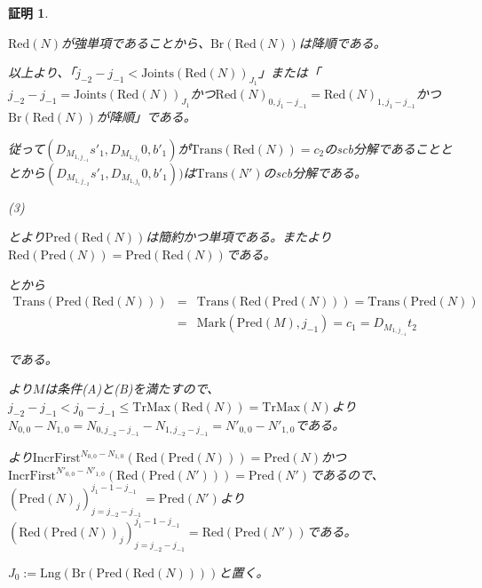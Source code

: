 \documentclass[dvipdfmx,uplatex]{jsarticle}
\theoremstyle{customnonumberbreakfortheorem}
\theoremstyle{customnonumberbreakforproof}
\newtheorem{hideableproof}{証明}
\begin{document}
\begin{hideableproof}
\begin{indented}
\begin{indented}
			\item \(\textrm{Red}(N)\)が強単項であることから、\(\textrm{Br}(\textrm{Red}(N))\)は降順である。
		\end{indented}
		\item 以上より、「\(j_{-2}-j_{-1} < \textrm{Joints}(\textrm{Red}(N))_{J_1}\)」または「\(j_{-2}-j_{-1} = \textrm{Joints}(\textrm{Red}(N))_{J_1}\)かつ\(\textrm{Red}(N)_{0,j_1-j_{-1}} = \textrm{Red}(N)_{1,j_1-j_{-1}}\)かつ\(\textrm{Br}(\textrm{Red}(N))\)が降順」である。
		\item 従って\((D_{M_{1,j_{-1}}} s'_1,D_{M_{1,j_1}} 0,b'_1)\)が\(\textrm{Trans}(\textrm{Red}(N)) = c_2\)のscb分解であることととから\((D_{M_{1,j_{-2}}} s'_1,D_{M_{1,j_1}} 0,b'_1))\)は\(\textrm{Trans}(N')\)のscb分解である。
		\item
		\item (3)
		\item {}とより\(\textrm{Pred}(\textrm{Red}(N))\)は簡約かつ単項である。またより\(\textrm{Red}(\textrm{Pred}(N)) = \textrm{Pred}(\textrm{Red}(N))\)である。
		\item {}とから
		\begin{eqnarray*}
		\textrm{Trans}(\textrm{Pred}(\textrm{Red}(N))) & = & \textrm{Trans}(\textrm{Red}(\textrm{Pred}(N))) = \textrm{Trans}(\textrm{Pred}(N)) \\
		& = & \textrm{Mark}(\textrm{Pred}(M),j_{-1}) = c_1 = D_{M_{1,j_{-1}}} t_2
		\end{eqnarray*}
		\item である。
		\item {}より\(M\)は条件(A)と(B)を満たすので、\(j_{-2}-j_{-1} < j_0-j_{-1} \leq \textrm{TrMax}(\textrm{Red}(N)) = \textrm{TrMax}(N)\)より\(N_{0,0}-N_{1,0} = N_{0,j_{-2}-j_{-1}}-N_{1,j_{-2}-j_{-1}} = N'_{0,0}-N'_{1,0}\)である。
		\item {}より\(\textrm{IncrFirst}^{N_{0,0}-N_{1,0}}(\textrm{Red}(\textrm{Pred}(N))) = \textrm{Pred}(N)\)かつ\(\textrm{IncrFirst}^{N'_{0,0}-N'_{1,0}}(\textrm{Red}(\textrm{Pred}(N'))) = \textrm{Pred}(N')\)であるので、\((\textrm{Pred}(N)_j)_{j=j_{-2}-j_{-1}}^{j_1-1-j_{-1}} = \textrm{Pred}(N')\)より\((\textrm{Red}(\textrm{Pred}(N))_j)_{j=j_{-2}-j_{-1}}^{j_1-1-j_{-1}} = \textrm{Red}(\textrm{Pred}(N'))\)である。
		\item \(J_0 := \textrm{Lng}(\textrm{Br}(\textrm{Pred}(\textrm{Red}(N))))\)と置く。

\end{indented}
\end{hideableproof}
\end{document}

